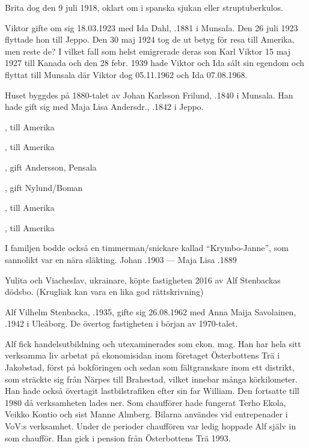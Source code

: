 Brita dog den 9 juli 1918, oklart om i spanska sjukan eller struptuberkulos.


Viktor gifte om sig 18.03.1923 med Ida Dahl, .1881 i Munsala. Den 26 juli 1923 flyttade hon till Jeppo. Den 30 maj 1924 tog de ut betyg för resa till Amerika, men reste de? I vilket fall som helst emigrerade deras son Karl Viktor 15 maj 1927 till Kanada och den 28 febr. 1939 hade Viktor och Ida sålt sin egendom och flyttat till Munsala där Viktor dog 05.11.1962 och Ida 07.08.1968.


Huset byggdes på 1880-talet av Johan Karlsson Frilund, .1840 i Munsala. Han hade gift sig med Maja Lisa Andersdr., .1842 i Jeppo.
\begin{jhchildren}
  \item {}, till Amerika
  \item {}, till Amerika
  \item {}
  \item {}, gift Andersson, Pensala
  \item {}, gift Nylund/Boman
  \item {}, till Amerika
  \item {}, till Amerika
\end{jhchildren}
I familjen bodde också en timmerman/snickare kallad ``Krymbo-Janne'', som sannolikt var en nära släkting.
Johan .1903  ---  Maja Lisa .1889





Yulita och Viacheslav, ukrainare, köpte fastigheten 2016 av Alf Stenbackas dödsbo. (Krugliak kan vara en lika god rättskrivning)\jhvspace{}



Alf Vilhelm Stenbacka, .1935, gifte sig 26.08.1962 med Anna Maija Savolainen, .1942 i Uleåborg. De övertog fastigheten i början av 1970-talet.

Alf fick handelsutbildning och utexaminerades som ekon. mag. Han har hela sitt verksamma liv arbetat på ekonomisidan inom företaget Österbottens Trä i Jakobstad, först på bokföringen och sedan som fältgranskare inom ett distrikt, som sträckte sig från Närpes till Brahestad, vilket innebar många körkilometer. Han hade också övertagit lastbilstrafiken efter sin far William. Den fortsatte till 1980 då verksamheten lades ner. Som chaufförer hade fungerat Terho Ekola, Veikko Kontio och sist Manne Almberg. Bilarna användes vid entrepenader i VoV:s verksamhet. Under de perioder chauffören var ledig hoppade Alf själv in som chaufför. Han gick i pension från Österbottens Trä 1993.

